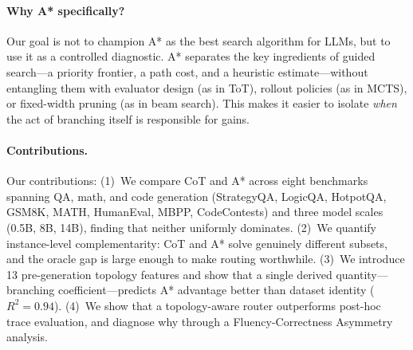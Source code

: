 \documentclass[11pt]{article}
\begin{document}


\paragraph{Why A* specifically?}
Our goal is not to champion A* as the best search algorithm for LLMs, but to use it as a controlled diagnostic. A* separates the key ingredients of guided search---a priority frontier, a path cost, and a heuristic estimate---without entangling them with evaluator design (as in ToT), rollout policies (as in MCTS), or fixed-width pruning (as in beam search). This makes it easier to isolate \emph{when} the act of branching itself is responsible for gains.

\paragraph{Contributions.}
Our contributions: (1)~We compare CoT and A* across eight benchmarks spanning QA, math, and code generation (StrategyQA, LogicQA, HotpotQA, GSM8K, MATH, HumanEval, MBPP, CodeContests) and three model scales (0.5B, 8B, 14B), finding that neither uniformly dominates. (2)~We quantify instance-level complementarity: CoT and A* solve genuinely different subsets, and the oracle gap is large enough to make routing worthwhile. (3)~We introduce 13 pre-generation topology features and show that a single derived quantity---branching coefficient---predicts A* advantage better than dataset identity ($R^2=0.94$). (4)~We show that a topology-aware router outperforms post-hoc trace evaluation, and diagnose why through a Fluency-Correctness Asymmetry analysis.
\end{document}
